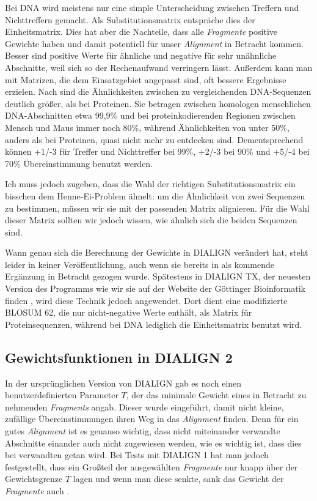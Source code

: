 Bei DNA wird meistens nur eine simple Unterscheidung zwischen Treffern und Nichttreffern gemacht. Als Substitutionsmatrix entspräche dies der Einheitsmatrix. Dies hat aber die Nachteile, dass alle \emph{Fragmente} positive Gewichte haben und damit potentiell für unser \emph{Alignment} in Betracht kommen. Besser sind positive Werte für ähnliche und negative für sehr unähnliche Abschnitte, weil sich so der Rechenaufwand verringern lässt. Außerdem kann man mit Matrizen, die dem Einsatzgebiet angepasst sind, oft bessere Ergebnisse erzielen. Nach \cite{p13} sind die Ähnlichkeiten zwischen zu vergleichenden DNA-Sequenzen deutlich größer, als bei Proteinen. Sie betragen zwischen homologen menschlichen DNA-Abschnitten etwa 99,9\% und bei proteinkodierenden Regionen zwischen Mensch und Maus immer noch 80\%, während Ähnlichkeiten von unter 50\%, anders als bei Proteinen, quasi nicht mehr zu entdecken sind. Dementsprechend können +1/-3 für Treffer und Nichttreffer bei 99\%, +2/-3 bei 90\% und +5/-4 bei 70\% Übereinstimmung benutzt werden.

Ich muss jedoch zugeben, dass die Wahl der richtigen Substitutionsmatrix ein bisschen dem Henne-Ei-Problem ähnelt: um die Ähnlichkeit von zwei Sequenzen zu bestimmen, müssen wir sie mit der passenden Matrix alignieren. Für die Wahl dieser Matrix sollten wir jedoch wissen, wie ähnlich sich die beiden Sequenzen sind.

Wann genau sich die Berechnung der Gewichte in DIALIGN verändert hat, steht leider in keiner Veröffentlichung, auch wenn sie bereits in \cite{mdw96} als kommende Ergänzung in Betracht gezogen wurde. Spätestens in DIALIGN TX, der neuesten Version des Programms wie wir sie auf der Website der Göttinger Bioinformatik finden \citep{DIALIGNTX}, wird diese Technik jedoch angewendet. Dort dient eine modifizierte BLOSUM 62, die nur nicht-negative Werte enthält, als Matrix für Proteinsequenzen, während bei DNA lediglich die Einheitsmatrix benutzt wird.

\subsection{Gewichtsfunktionen in DIALIGN 2} 

In der ursprünglichen Version von DIALIGN gab es noch einen benutzerdefinierten Parameter $T$, der das minimale Gewicht eines in Betracht zu nehmenden \emph{Fragments} angab. Dieser wurde eingeführt, damit nicht kleine, zufällige Übereinstimmungen ihren Weg in das \emph{Alignment} finden. Denn für ein gutes \emph{Alignment} ist es genauso wichtig, dass nicht miteinander verwandte Abschnitte einander auch nicht zugewiesen werden, wie es wichtig ist, dass dies bei verwandten getan wird. Bei Tests mit DIALIGN 1 hat man jedoch festgestellt, dass ein Großteil der ausgewählten \emph{Fragmente} nur knapp über der Gewichtsgrenze $T$ lagen und wenn man diese senkte, sank das Gewicht der \emph{Fragmente} auch \citep{mahd98}. 

